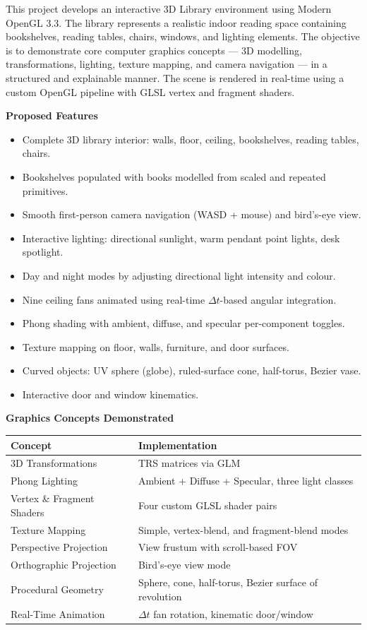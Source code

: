 \documentclass[12pt, a4paper]{article}
\begin{document}
\medskip
This project develops an interactive 3D Library environment using Modern OpenGL 3.3. The library represents a realistic indoor reading space containing bookshelves, reading tables, chairs, windows, and lighting elements. The objective is to demonstrate core computer graphics concepts — 3D modelling, transformations, lighting, texture mapping, and camera navigation — in a structured and explainable manner. The scene is rendered in real-time using a custom OpenGL pipeline with GLSL vertex and fragment shaders.

\medskip\noindent\textbf{Proposed Features}

\begin{itemize}[leftmargin=1.5em]
    \item Complete 3D library interior: walls, floor, ceiling, bookshelves, reading tables, chairs.
    \item Bookshelves populated with books modelled from scaled and repeated primitives.
    \item Smooth first-person camera navigation (WASD + mouse) and bird's-eye view.
    \item Interactive lighting: directional sunlight, warm pendant point lights, desk spotlight.
    \item Day and night modes by adjusting directional light intensity and colour.
    \item Nine ceiling fans animated using real-time $\Delta t$-based angular integration.
    \item Phong shading with ambient, diffuse, and specular per-component toggles.
    \item Texture mapping on floor, walls, furniture, and door surfaces.
    \item Curved objects: UV sphere (globe), ruled-surface cone, half-torus, Bezier vase.
    \item Interactive door and window kinematics.
\end{itemize}

\medskip\noindent\textbf{Graphics Concepts Demonstrated}

\begin{center}
\begin{tabular}{ll}
\toprule
\textbf{Concept} & \textbf{Implementation} \\
\midrule
3D Transformations & TRS matrices via GLM \\
Phong Lighting & Ambient + Diffuse + Specular, three light classes \\
Vertex \& Fragment Shaders & Four custom GLSL shader pairs \\
Texture Mapping & Simple, vertex-blend, and fragment-blend modes \\
Perspective Projection & View frustum with scroll-based FOV \\
Orthographic Projection & Bird's-eye view mode \\
Procedural Geometry & Sphere, cone, half-torus, Bezier surface of revolution \\
Real-Time Animation & $\Delta t$ fan rotation, kinematic door/window \\
\bottomrule
\end{tabular}
\end{center}
\end{document}
